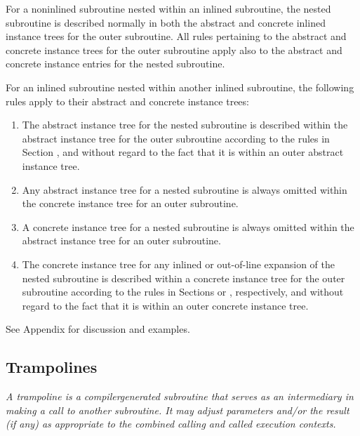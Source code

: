 For a non\dash inlined subroutine nested within an inlined
subroutine, the nested subroutine is described normally in
both the abstract and concrete inlined instance trees for
the outer subroutine. All rules pertaining to the abstract
and concrete instance trees for the outer subroutine apply
also to the abstract and concrete instance entries for the
nested subroutine.

For an inlined subroutine nested within another inlined
subroutine, the following rules apply to their abstract and
concrete instance trees:

\begin{enumerate}[1.]
\item The abstract instance tree for the nested subroutine is
described within the abstract instance tree for the outer
subroutine according to the rules in 
Section , and
without regard to the fact that it is within an outer abstract
instance tree.

\item Any abstract instance tree for a nested subroutine is
always omitted within the concrete instance tree for an
outer subroutine.

\item  A concrete instance tree for a nested subroutine is
always omitted within the abstract instance tree for an
outer subroutine.

\item The concrete instance tree for any inlined or out-of-line
expansion of the nested subroutine is described within a
concrete instance tree for the outer subroutine according
to the rules in 
Sections  or 
, respectively,
and without regard to the fact that it is within an outer
concrete instance tree.
\end{enumerate}

See Appendix  
for discussion and examples.

\subsection{Trampolines}
\label{chap:trampolines}

\textit{A trampoline is a compiler\dash generated subroutine that serves as
an intermediary in making a call to another subroutine. It may
adjust parameters and/or the result (if any) as appropriate
to the combined calling and called execution contexts.}


